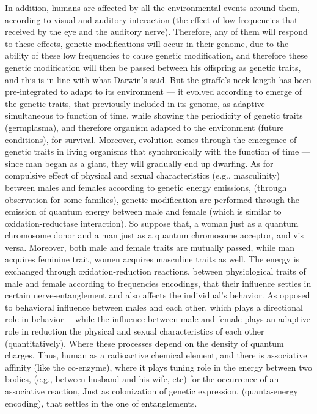 \begin{Summary}
{{{{In addition, humans are affected by all the environmental events around them, according to visual and auditory interaction (the effect of low frequencies that received by the eye and the auditory nerve). Therefore, any of them will respond to these effects, genetic modifications will occur in their genome, due to the ability of these low frequencies to cause genetic modification, and therefore these genetic modification will then be passed between his offspring as genetic traits, and this is in line with what Darwin's said. But the giraffe's neck length has been pre-integrated to adapt to its environment — it evolved according to emerge of the genetic traits, that previously included in its genome, as adaptive simultaneous to function of time, while showing the periodicity of genetic traits (germplasma), and therefore organism adapted to the environment (future conditions), for survival. Moreover, evolution comes through the emergence of genetic traits in living organisms that synchronically with the function of time — since man began as a giant, they will gradually end up dwarfing. 
As for compulsive effect of physical and sexual characteristics (e.g., masculinity) between males and females according to genetic energy emissions, (through observation for some families), genetic modification are performed through the emission of quantum energy between male and female (which is similar to oxidation-reductase interaction). So suppose that, a woman just as a quantum chromosome donor and a man just as a quantum chromosome acceptor, and vis versa. Moreover, both male and female traits are mutually passed, while man acquires feminine trait, women acquires masculine traits as well.
The energy is exchanged through oxidation-reduction reactions, between physiological traits of male and female according to frequencies encodings, that their influence settles in certain nerve-entanglement and also affects the individual's behavior. As opposed to behavioral influence between males and each other, which plays a directional role in behavior— while the influence between male and female plays an adaptive role in reduction the physical and sexual characteristics of each other (quantitatively). Where these processes depend on the density of quantum charges. Thus, human as a radioactive chemical element, and there is associative affinity (like the co-enzyme), where it plays tuning role in the energy between two bodies, (e.g., between husband and his wife, etc) for the occurrence of an associative reaction, Just as colonization of genetic expression, (quanta-energy encoding), that settles in the one of entanglements.  
}}}}
\end{Summary}
